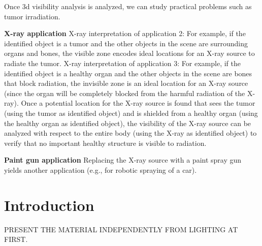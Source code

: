 \documentclass[9pt,twocolumn]{article}
\begin{document}
Once 3d visibility analysis is analyzed, we can study practical problems
such as tumor irradiation.

{\bf X-ray application}
X-ray interpretation of application 2:
For example, if the identified object is a tumor and the other objects in the scene
are surrounding organs and bones,
the visible zone encodes ideal locations for an X-ray source to radiate the tumor.
X-ray interpretation of application 3:
For example, if the identified object is a healthy organ
and the other objects in the scene are bones that block radiation,
the invisible zone is an ideal location for an X-ray source (since the organ will
be completely blocked from the harmful radiation of the X-ray).
Once a potential location for the X-ray source is found that sees the tumor (using the
tumor as identified object) and
is shielded from a healthy organ (using the healthy organ as identified object), 
the visibility of the X-ray source can be analyzed
with respect to the entire body (using the X-ray as identified object)
to verify that no important healthy structure is
visible to radiation.

{\bf Paint gun application}
Replacing the X-ray source with a paint spray gun yields another application
(e.g., for robotic spraying of a car).


\clearpage

\section{Introduction}

PRESENT THE MATERIAL INDEPENDENTLY FROM LIGHTING AT FIRST.
\end{document}
